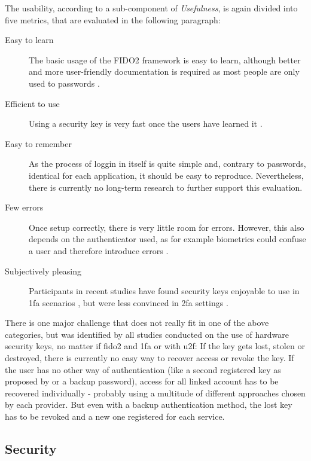 The usability, according to \cite[25 \psq]{nielsen1993} a sub-component of \emph{Usefulness}, is again divided into five metrics, that are evaluated in the following paragraph:

\begin{description}
    \item[Easy to learn] The basic usage of the FIDO2 framework is easy to learn, although better and more user-friendly documentation is required as most people are only used to passwords \cite{lyastani2020,hunt2018b,das2018}.
    \item[Efficient to use] Using a security key is very fast once the users have learned it \cite{lang2017}.
    \item[Easy to remember] As the process of loggin in itself is quite simple and, contrary to passwords, identical for each application, it should be easy to reproduce. Nevertheless, there is currently no long-term research to further support this evaluation.
    \item[Few errors] Once setup correctly, there is very little room for errors. However, this also depends on the authenticator used, as for example biometrics could confuse a user and therefore introduce errors \cite{lyastani2020}.
    \item[Subjectively pleasing] Participants in recent studies have found security keys enjoyable to use in \ac{1fa} scenarios \citep{lyastani2020}, but were less convinced in \ac{2fa} settings \cite{das2018}.
\end{description}

There is one major challenge that does not really fit in one of the above categories, but was identified by all studies conducted on the use of hardware security keys, no matter if \ac{fido2} and \ac{1fa} or with \ac{u2f}: If the key gets lost, stolen or destroyed, there is currently no easy way to recover access or revoke the key. If the user has no other way of authentication (like a second registered key as proposed by \cite{gomi2019} or a backup password), access for all linked account has to be recovered individually - probably using a multitude of different approaches chosen by each provider. But even with a backup authentication method, the lost key has to be revoked and a new one registered for each service.\\

\subsection{Security}

